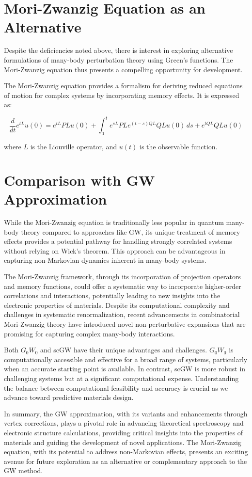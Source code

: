 \section*{Mori-Zwanzig Equation as an Alternative}

Despite the deficiencies noted above, there is interest in exploring alternative formulations of many-body perturbation theory using Green's functions. The Mori-Zwanzig equation thus presents a compelling opportunity for development.

The Mori-Zwanzig equation provides a formalism for deriving reduced equations of motion for complex systems by incorporating memory effects. It is expressed as:

\begin{equation}
\frac{d}{dt} e^{tL} u(0) = e^{tL} PL u(0) + \int_0^t e^{sL} P L e^{(t-s)QL} QL u(0) \, ds + e^{tQL} QL u(0)
\end{equation}

where \( L \) is the Liouville operator, and \( u(t) \) is the observable function.

\section*{Comparison with GW Approximation}

While the Mori-Zwanzig equation is traditionally less popular in quantum many-body theory compared to approaches like GW, its unique treatment of memory effects provides a potential pathway for handling strongly correlated systems without relying on Wick's theorem. This approach can be advantageous in capturing non-Markovian dynamics inherent in many-body systems.

The Mori-Zwanzig framework, through its incorporation of projection operators and memory functions, could offer a systematic way to incorporate higher-order correlations and interactions, potentially leading to new insights into the electronic properties of materials. Despite its computational complexity and challenges in systematic renormalization, recent advancements in combinatorial Mori-Zwanzig theory have introduced novel non-perturbative expansions that are promising for capturing complex many-body interactions.

Both \( G_0W_0 \) and scGW have their unique advantages and challenges. \( G_0W_0 \) is computationally accessible and effective for a broad range of systems, particularly when an accurate starting point is available. In contrast, scGW is more robust in challenging systems but at a significant computational expense. Understanding the balance between computational feasibility and accuracy is crucial as we advance toward predictive materials design.

In summary, the GW approximation, with its variants and enhancements through vertex corrections, plays a pivotal role in advancing theoretical spectroscopy and electronic structure calculations, providing critical insights into the properties of materials and guiding the development of novel applications. The Mori-Zwanzig equation, with its potential to address non-Markovian effects, presents an exciting avenue for future exploration as an alternative or complementary approach to the GW method.

